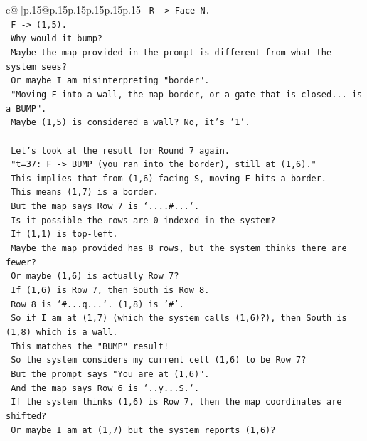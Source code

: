 \documentclass{article}
\begin{document}
{\begin{supertabular}{c@{$\;$}|p{.15\linewidth}@{}p{.15\linewidth}p{.15\linewidth}p{.15\linewidth}p{.15\linewidth}p{.15\linewidth}}
{{{\texttt{      R {-}> Face N.} \\
\texttt{      F {-}> (1,5).} \\
\texttt{      Why would it bump?} \\
\texttt{      Maybe the map provided in the prompt is different from what the system sees?} \\
\texttt{      Or maybe I am misinterpreting "border".} \\
\texttt{      "Moving F into a wall, the map border, or a gate that is closed... is a BUMP".} \\
\texttt{      Maybe (1,5) is considered a wall? No, it's '1'.} \\
\\ 
\texttt{      Let's look at the result for Round 7 again.} \\
\texttt{      "t=37: F {-}> BUMP (you ran into the border), still at (1,6)."} \\
\texttt{      This implies that from (1,6) facing S, moving F hits a border.} \\
\texttt{      This means (1,7) is a border.} \\
\texttt{      But the map says Row 7 is `....\#...`.} \\
\texttt{      Is it possible the rows are 0{-}indexed in the system?} \\
\texttt{      If (1,1) is top{-}left.} \\
\texttt{      Maybe the map provided has 8 rows, but the system thinks there are fewer?} \\
\texttt{      Or maybe (1,6) is actually Row 7?} \\
\texttt{      If (1,6) is Row 7, then South is Row 8.} \\
\texttt{      Row 8 is `\#...q...`. (1,8) is '\#'.} \\
\texttt{      So if I am at (1,7) (which the system calls (1,6)?), then South is (1,8) which is a wall.} \\
\texttt{      This matches the "BUMP" result!} \\
\texttt{      So the system considers my current cell (1,6) to be Row 7?} \\
\texttt{      But the prompt says "You are at (1,6)".} \\
\texttt{      And the map says Row 6 is `..y...S.`.} \\
\texttt{      If the system thinks (1,6) is Row 7, then the map coordinates are shifted?} \\
\texttt{      Or maybe I am at (1,7) but the system reports (1,6)?} \\
}}}
\end{supertabular}}
\end{document}
